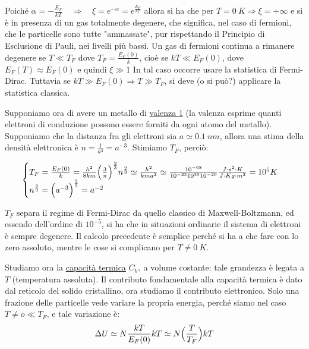 \newpage
\iffalse

Poiché $\alpha = -\frac{ E_F}{k T} \quad \Rightarrow \quad \xi = e^{-\alpha} = e^{ \frac{ E_F}{k T}}$ allora si ha che per $T=\SI{0}{K} \Rightarrow \xi = +\infty $
e si è in presenza di un gas totalmente degenere, che significa, nel caso di fermioni, che le particelle sono tutte "ammassate", pur rispettando il Principio di Esclusione di Pauli, nei livelli più bassi.
Un gas di fermioni continua a rimanere degenere se $T \ll T_F$ dove $T_F = \frac{ E_F(0)}{k}$, cioè se $kT \ll E_F(0)$, 
dove $E_F(T) \approx E_F(0)$ e quindi $\xi \gg 1$
In tal caso occorre usare la statistica di Fermi-Dirac.
Tuttavia se $kT \gg E_F(0) \Rightarrow T \gg T_F $, si deve (o si può?) applicare la statistica classica.

Supponiamo ora di avere un metallo di \underline{valenza 1} (la valenza esprime quanti elettroni di conduzione possono essere forniti da ogni atomo del metallo).
Supponiamo che la distanza fra gli elettroni sia $a \simeq \SI{0.1}{nm}$, allora una stima della densità elettronica è $n = \frac{ 1}{a^{ 3}} = a^{ -3}$.
Stimiamo $T_F$, perciò:

\begin{equation}
\begin{cases}
	T_F = \frac{ E_F(0)}{k} = \frac{ h^2}{8 k m} \Bigl(  \frac{ 3}{\pi}  \Bigr)^{ \frac{ 2}{3}} n^{ \frac{ 2}{3}} \simeq \frac{ h^2}{k m a^2} \simeq \frac{ 10^{ -68}}{10^{-23 } 10^{ 30} 10^{-20 }} \frac{ J \cdot s^2 \cdot K}{J \cdot Kg \cdot m^2} = 10^{5} K \\
	n^{ \frac{ 2}{3}} = \Bigl(  a^{ -3}  \Bigr)^{ \frac{ 2}{3}} = a^{ -2}
\end{cases}
\end{equation}

$T_F$ separa il regime di Fermi-Dirac da quello classico di Maxwell-Boltzmann, ed essendo dell'ordine di $10^{ -5}$, si ha che in situazioni ordinarie il sistema di elettroni è sempre degenere.
Il calcolo precedente è semplice perché si ha a che fare con lo zero assoluto, mentre le cose si complicano per $T \not =\SI{0}{K} $.

Studiamo ora la \underline{capacità termica} $C_V$, a volume costante: tale grandezza è legata a $T$ (temperatura assoluta).
Il contributo fondamentale alla capacità termica è dato dal reticolo del solido cristallino, ora studiamo il contributo elettronico.
Solo una frazione delle particelle vede variare la propria energia, perché siamo nel caso $T \not = o \ll T_F$, e tale variazione è:
$$ \Delta U \simeq N \frac{ k T}{E_F(0)} kT \simeq N\Bigl(  \frac{ T}{T_F}  \Bigr)kT $$

